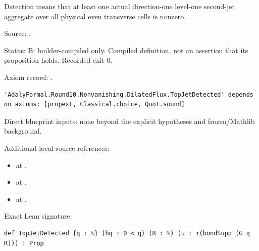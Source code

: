 \begin{definition}[bp-151]
\label{bp-151}
\uses{}
\leanok
Detection means that at least one actual direction-one level-one second-jet aggregate over all physical even transverse cells is nonzero.

\par Source: \texttt{}.
\par Status: B: builder-compiled only. Compiled definition, not an assertion that its proposition holds. Recorded exit 0.
\par Axiom record: \texttt{}.
\begin{verbatim}
'AdalyFormal.Round10.Nonvanishing.DilatedFlux.TopJetDetected' depends on axioms: [propext, Classical.choice, Quot.sound]
\end{verbatim}
\par Direct blueprint inputs: none beyond the explicit hypotheses and frozen/Mathlib background.
\par Additional local source references:
\begin{itemize}
\item \texttt{} at \texttt{}.
\item \texttt{} at \texttt{}.
\item \texttt{} at \texttt{}.
\end{itemize}
\par Exact Lean signature:
\begin{verbatim}
def TopJetDetected {q : ℕ} (hq : 0 < q) (R : ℕ) (u : ↥(bondSupp (G q R))) : Prop
\end{verbatim}
\end{definition}

